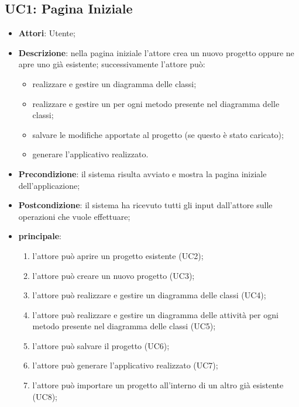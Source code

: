 \subsection{UC1: Pagina Iniziale}
\label{UC1}
\begin{itemize}
	\item \textbf{Attori}: Utente;
	\item \textbf{Descrizione}: nella pagina iniziale l'attore crea un nuovo progetto oppure ne apre uno già esistente; successivamente l'attore può:
	\begin{itemize}
		\item realizzare e gestire un diagramma delle classi;
		\item realizzare e gestire un  per ogni metodo presente nel diagramma delle classi;
		\item salvare le modifiche apportate al progetto (se questo è stato caricato);
		\item generare l'applicativo realizzato.
	\end{itemize}
	\item \textbf{Precondizione}: il sistema risulta avviato e mostra la pagina iniziale dell'applicazione;
	\item \textbf{Postcondizione}: il sistema ha ricevuto tutti gli input dall'attore sulle operazioni che vuole effettuare;
	\item \textbf{ principale}:
	\begin{enumerate}
		\item l'attore può aprire un progetto esistente (UC2);
		\item l'attore può creare un nuovo progetto (UC3);
		\item l'attore può realizzare e gestire un diagramma delle classi (UC4);
		\item l'attore può realizzare e gestire un diagramma delle attività per ogni metodo presente nel diagramma delle classi (UC5);
		\item l'attore può salvare il progetto (UC6);
		\item l'attore può generare l'applicativo realizzato (UC7);
		\item l'attore può importare un progetto all'interno di un altro già esistente (UC8);
	\end{enumerate}
\end{itemize}

